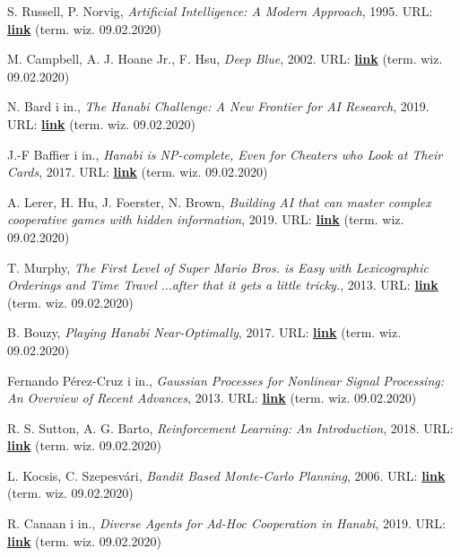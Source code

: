 \documentclass[declaration,shortabstract,inz]{iithesis}
\begin{document}
\begin{thebibliography}{4}

 S. Russell, P. Norvig, \textit{Artificial Intelligence: A Modern Approach}, 1995. URL: \href{https://www.cin.ufpe.br/~tfl2/artificial-intelligence-modern-approach.9780131038059.25368.pdf}{\textbf{link}} (term. wiz. 09.02.2020)

 M. Campbell, A. J. Hoane Jr., F. Hsu, \textit{Deep Blue}, 2002. URL: 
\href{https://core.ac.uk/download/pdf/82416379.pdf}{\textbf{link}} (term. wiz. 09.02.2020)

 N. Bard i in., \textit{The Hanabi Challenge: A New Frontier for AI Research}, 2019. URL: 
\href{https://arxiv.org/pdf/1902.00506.pdf}{\textbf{link}} (term. wiz. 09.02.2020)

 J.-F Baffier i in., \textit{Hanabi is NP-complete, Even for Cheaters who Look at Their Cards}, 2017. URL: 
\href{https://arxiv.org/pdf/1603.01911.pdf}{\textbf{link}} (term. wiz. 09.02.2020)

 A. Lerer, H. Hu, J. Foerster, N. Brown, \textit{Building AI that can master complex cooperative games with hidden information}, 2019. URL: 
\href{https://ai.facebook.com/blog/building-ai-that-can-master-complex-cooperative-games-with-hidden-information/}{\textbf{link}} (term. wiz. 09.02.2020)

 T. Murphy, \textit{The First Level of Super Mario Bros. is Easy with Lexicographic Orderings and Time Travel $\ldots$after that it gets a little tricky.}, 2013. URL: 
\href{http://www.cs.cmu.edu/~tom7/mario/mario.pdf}{\textbf{link}} (term. wiz. 09.02.2020)

 B. Bouzy, \textit{Playing Hanabi Near-Optimally}, 2017. URL: 
\href{http://helios.mi.parisdescartes.fr/~bouzy/publications/bouzy-hanabi-2017.pdf}{\textbf{link}} (term. wiz. 09.02.2020)

 Fernando Pérez-Cruz i in., \textit{Gaussian Processes for Nonlinear Signal Processing: An Overview of Recent Advances}, 2013. URL: 
\href{https://www.researchgate.net/publication/260637079_Gaussian_Processes_for_Nonlinear_Signal_Processing_An_Overview_of_Recent_Advances}{\textbf{link}} (term. wiz. 09.02.2020)

 R. S. Sutton, A. G. Barto, \textit{Reinforcement Learning: An Introduction}, 2018. URL: 
\href{http://incompleteideas.net/book/RLbook2018.pdf}{\textbf{link}} (term. wiz. 09.02.2020)

 L. Kocsis, C. Szepesvári, \textit{Bandit Based Monte-Carlo Planning}, 2006. URL: 
\href{https://link.springer.com/content/pdf/10.1007/11871842_29.pdf}{\textbf{link}} (term. wiz. 09.02.2020)

 R. Canaan i in., \textit{Diverse Agents for Ad-Hoc Cooperation in Hanabi}, 2019. URL: 
\href{https://arxiv.org/pdf/1907.03840.pdf}{\textbf{link}} (term. wiz. 09.02.2020)

\end{thebibliography}
\end{document}
